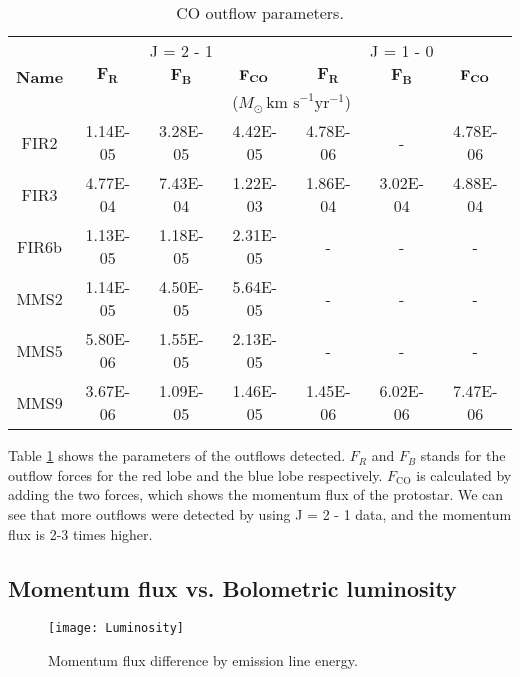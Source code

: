 \begin{table}[h]
	\caption{CO outflow parameters.} \label{result}
	\begin{center}
		\begin{tabular}{c|c|c|c||c|c|c}
			\toprule
			\multirow{3}{1cm}{\textbf{Name}} & \multicolumn{3}{c}{J = 2 - 1} & \multicolumn{3}{c}{J = 1 - 0} \\
			& $\mathbf{F_{R}}$ & $\mathbf{F_{B}}$ & $\mathbf{F_{\textrm{\textbf{CO}}}}$ & $\mathbf{F_{R}}$ & $\mathbf{F_{B}}$ & $\mathbf{F_{\textrm{\textbf{CO}}}}$\\
			& \multicolumn{6}{c}{($M_{\odot} \, \textrm{km s}^{-1} \textrm{yr}^{-1}$)}\\
			\midrule
			FIR2 & 1.14E-05 & 3.28E-05 & 4.42E-05 & 4.78E-06 & - & 4.78E-06\\
			FIR3 & 4.77E-04 & 7.43E-04 & 1.22E-03 & 1.86E-04 & 3.02E-04 & 4.88E-04\\
			FIR6b & 1.13E-05 & 1.18E-05 & 2.31E-05 & - & - & -\\
			MMS2 & 1.14E-05 & 4.50E-05 & 5.64E-05 & - & - & -\\
			MMS5 & 5.80E-06 & 1.55E-05 & 2.13E-05 & - & - & -\\
			MMS9 & 3.67E-06 & 1.09E-05 & 1.46E-05 & 1.45E-06 & 6.02E-06 & 7.47E-06\\
			\toprule
		\end{tabular}
	\end{center}
\end{table}


Table \noindent\ref{result} shows the parameters of the outflows detected. $F_R$ and $F_B$ stands for the outflow forces for the red lobe and the blue lobe respectively. $F_{\textrm{CO}}$ is calculated by adding the two forces, which shows the momentum flux of the protostar. We can see that more outflows were detected by using J = 2 - 1 data, and the momentum flux is 2-3 times higher.\\

\clearpage
\newpage
\subsection{Momentum flux vs. Bolometric luminosity}


\begin{figure}[h!]
	\centering
	\texttt{[image: Luminosity]}
	\caption{Momentum flux difference by emission line energy.}
\end{figure}


